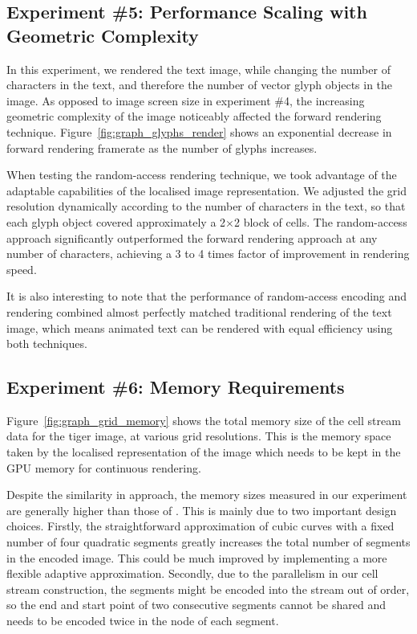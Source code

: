 \documentclass[11pt,a4paper,twoside]{article}
\begin{document}
\subsection {Experiment \#5: Performance Scaling with Geometric Complexity}

In this experiment, we rendered the text image, while changing the number of characters in the text, and therefore the number of vector glyph objects in the image. As opposed to image screen size in experiment \#4, the increasing geometric complexity of the image noticeably affected the forward rendering technique. Figure~\ref{fig:graph_glyphs_render} shows an exponential decrease in forward rendering framerate as the number of glyphs increases.

When testing the random-access rendering technique, we took advantage of the adaptable capabilities of the localised image representation. We adjusted the grid resolution dynamically according to the number of characters in the text, so that each glyph object covered approximately a 2$\times$2 block of cells. The random-access approach significantly outperformed the forward rendering approach at any number of characters, achieving a 3 to 4 times factor of improvement in rendering speed.

It is also interesting to note that the performance of random-access encoding and rendering combined almost perfectly matched traditional rendering of the text image, which means animated text can be rendered with equal efficiency using both techniques.

\subsection {Experiment \#6: Memory Requirements}

Figure~\ref{fig:graph_grid_memory} shows the total memory size of the cell stream data for the tiger image, at various grid resolutions. This is the memory space taken by the localised representation of the image which needs to be kept in the GPU memory for continuous rendering.

Despite the similarity in approach, the memory sizes measured in our experiment are generally higher than those of \cite{NehabHoppe08}. This is mainly due to two important design choices. Firstly, the straightforward approximation of cubic curves with a fixed number of four quadratic segments greatly increases the total number of segments in the encoded image. This could be much improved by implementing a more flexible adaptive approximation. Secondly, due to the parallelism in our cell stream construction, the segments might be encoded into the stream out of order, so the end and start point of two consecutive segments cannot be shared and needs to be encoded twice in the node of each segment.
\end{document}
